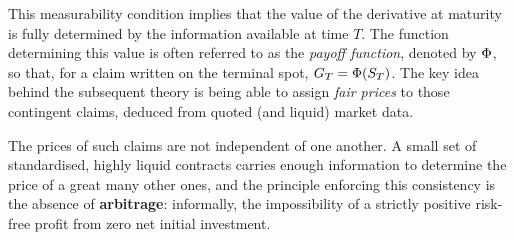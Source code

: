 This measurability condition implies that the value of the derivative at maturity is fully determined by the information available at time $T$. The function determining this value is often referred to as the \textit{payoff function}, denoted by $\Phi$, so that, for a claim written on the terminal spot, $G_T = \Phi(S_T)$. The key idea behind the subsequent theory is being able to assign \textit{fair prices} to those contingent claims, deduced from quoted (and liquid) market data.

The prices of such claims are not independent of one another. A small set of standardised, highly
liquid contracts carries enough information to determine the price of a great many other ones, and
the principle enforcing this consistency is the absence of \textbf{arbitrage}: informally, the
impossibility of a strictly positive risk-free profit from zero net initial investment.




 



